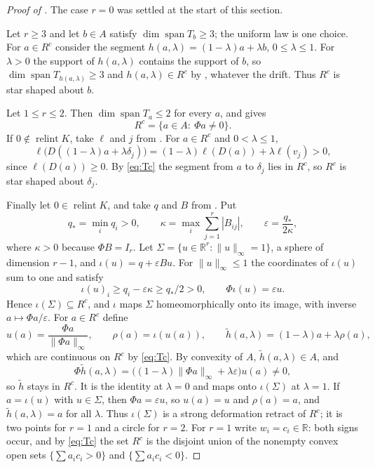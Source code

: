 \documentclass[11pt]{article}
\theoremstyle{remark}
\DeclareMathOperator{\spn}{span}
\DeclareMathOperator{\relint}{relint}
\newcommand{\R}{\mathbb{R}}
\begin{document}
\begin{proof}[Proof of ]
The case $r=0$ was settled at the start of this section.

Let $r\ge 3$ and let $b\in A$ satisfy $\dim\spn T_b\ge 3$; the uniform law is one choice. For $a\in R^c$ consider the
segment $h(a,\lambda)=(1-\lambda)a+\lambda b$, $0\le\lambda\le 1$. For $\lambda>0$ the support of $h(a,\lambda)$ contains
the support of $b$, so $\dim\spn T_{h(a,\lambda)}\ge 3$ and $h(a,\lambda)\in R^c$ by , whatever the
drift. Thus $R^c$ is star shaped about $b$.

Let $1\le r\le 2$. Then $\dim\spn T_a\le 2$ for every $a$, and  gives
\begin{equation}\label{eq:Tc}
R^c=\{a\in A:\ \Phi a\neq 0\}.
\end{equation}
If $0\notin\relint K$, take $\ell$ and $j$ from . For $a\in R^c$ and $0<\lambda\le 1$,
\[
\ell\bigl(D((1-\lambda)a+\lambda \delta_j)\bigr)=(1-\lambda)\ell(D(a))+\lambda\ell(v_j)>0,
\]
since $\ell(D(a))\ge 0$. By \eqref{eq:Tc} the segment from $a$ to $\delta_j$ lies in $R^c$, so $R^c$ is star shaped about
$\delta_j$.

Finally let $0\in\relint K$, and take $q$ and $B$ from . Put
\[
q_*=\min_iq_i>0,\qquad \kappa=\max_i\sum_{j=1}^r|B_{ij}|,\qquad \varepsilon=\frac{q_*}{2\kappa},
\]
where $\kappa>0$ because $\Phi B=I_r$. Let $\Sigma=\{u\in\R^r:\|u\|_\infty=1\}$, a sphere of dimension $r-1$, and
$\iota(u)=q+\varepsilon Bu$. For $\|u\|_\infty\le 1$ the coordinates of $\iota(u)$ sum to one and satisfy
\begin{equation}\label{eq:sphere}
\iota(u)_i\ge q_i-\varepsilon\kappa\ge q_*/2>0,\qquad \Phi \iota(u)=\varepsilon u .
\end{equation}
Hence $\iota(\Sigma)\subseteq R^c$, and $\iota$ maps $\Sigma$ homeomorphically onto its image, with inverse $a\mapsto \Phi a/\varepsilon$.
For $a\in R^c$ define
\[
u(a)=\frac{\Phi a}{\|\Phi a\|_\infty},\qquad \rho(a)=\iota(u(a)),\qquad \tilde h(a,\lambda)=(1-\lambda)a+\lambda\rho(a),
\]
which are continuous on $R^c$ by \eqref{eq:Tc}. By convexity of $A$, $\tilde h(a,\lambda)\in A$, and
\[
\Phi \tilde h(a,\lambda)=\bigl((1-\lambda)\|\Phi a\|_\infty+\lambda\varepsilon\bigr)u(a)\neq 0,
\]
so $\tilde h$ stays in $R^c$. It is the identity at $\lambda=0$ and maps onto $\iota(\Sigma)$ at $\lambda=1$. If $a=\iota(u)$ with
$u\in\Sigma$, then $\Phi a=\varepsilon u$, so $u(a)=u$ and $\rho(a)=a$, and $\tilde h(a,\lambda)=a$ for all $\lambda$. Thus $\iota(\Sigma)$
is a strong deformation retract of $R^c$; it is two points for $r=1$ and a circle for $r=2$. For $r=1$ write
$w_i=c_i\in\R$: both signs occur, and by \eqref{eq:Tc} the set $R^c$ is the disjoint union of the nonempty convex open sets
$\{\sum a_ic_i>0\}$ and $\{\sum a_ic_i<0\}$.
\end{proof}
\end{document}
